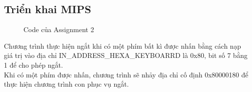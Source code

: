 \documentclass[a4paper,12pt]{article}
\begin{document}
\subsection{Triển khai MIPS}
\FloatBarrier
\begin{figure}[ht!]
	\centerline{}
	\caption*{}
	\label{fig:ass1}
\end{figure}
\clearpage
\FloatBarrier
\begin{figure}[ht!]
	\centerline{}
	\caption{Code của Assignment 2}
	\label{fig:ass1}
\end{figure}
\noindent
Chương trình thực hiện ngắt khi có một phím bất kì được nhấn bằng cách nạp giá trị vào địa chỉ IN\_ADDRESS\_HEXA\_KEYBOARRD là 0x80, bit số 7 bằng 1 để cho phép ngắt. \\
Khi có một phím được nhấn, chương trình sẽ nhảy địa chỉ cố định 0x80000180 để thực hiện chương trình con phục vụ ngắt. \\
\end{document}
